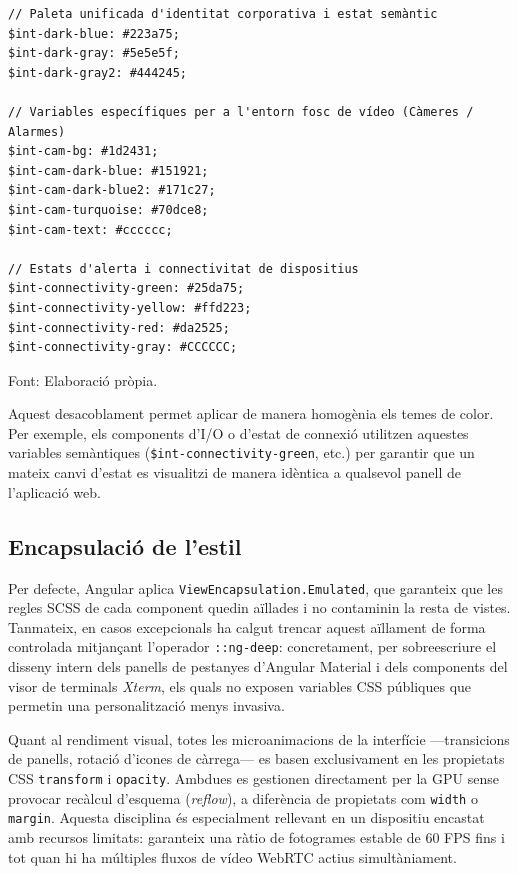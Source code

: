 \begin{lstlisting}[basicstyle=\footnotesize, label={lst:scss_variables}, caption={Fragment del fitxer de definició de variables d'estil SCSS.}]
// Paleta unificada d'identitat corporativa i estat semàntic
$int-dark-blue: #223a75;
$int-dark-gray: #5e5e5f;
$int-dark-gray2: #444245;

// Variables específiques per a l'entorn fosc de vídeo (Càmeres / Alarmes)
$int-cam-bg: #1d2431;
$int-cam-dark-blue: #151921;
$int-cam-dark-blue2: #171c27;
$int-cam-turquoise: #70dce8;
$int-cam-text: #cccccc;

// Estats d'alerta i connectivitat de dispositius
$int-connectivity-green: #25da75;
$int-connectivity-yellow: #ffd223;
$int-connectivity-red: #da2525;
$int-connectivity-gray: #CCCCCC;
\end{lstlisting}
\smallskip\par{\small\noindent Font: Elaboració pròpia.}

\medskip
Aquest desacoblament permet aplicar de manera homogènia els temes de color. Per exemple, els components d'I/O o d'estat de connexió utilitzen aquestes variables semàntiques (\texttt{\$int-connectivity-green}, etc.) per garantir que un mateix canvi d'estat es visualitzi de manera idèntica a qualsevol panell de l'aplicació web.

\subsection{Encapsulació de l'estil}
Per defecte, Angular aplica \texttt{ViewEncapsulation.Emulated}, que garanteix que les regles SCSS de cada component quedin aïllades i no contaminin la resta de vistes. Tanmateix, en casos excepcionals ha calgut trencar aquest aïllament de forma controlada mitjançant l'operador \texttt{::ng-deep}: concretament, per sobreescriure el disseny intern dels panells de pestanyes d'Angular Material i dels components del visor de terminals \textit{Xterm}, els quals no exposen variables CSS públiques que permetin una personalització menys invasiva.

Quant al rendiment visual, totes les microanimacions de la interfície —transicions de panells, rotació d'icones de càrrega— es basen exclusivament en les propietats CSS \texttt{transform} i \texttt{opacity}. Ambdues es gestionen directament per la GPU sense provocar recàlcul d'esquema (\textit{reflow}), a diferència de propietats com \texttt{width} o \texttt{margin}. Aquesta disciplina és especialment rellevant en un dispositiu encastat amb recursos limitats: garanteix una ràtio de fotogrames estable de 60 FPS fins i tot quan hi ha múltiples fluxos de vídeo WebRTC actius simultàniament.

